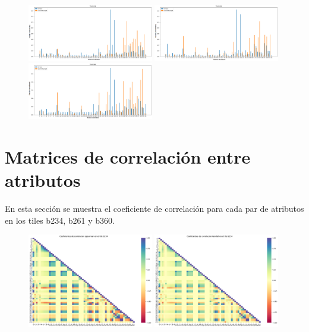 \begin{appendix}
\begin{figure}[h!]
\centering
  \includegraphics[width=0.49\textwidth]{Kap6/test=b234_ML_variable_importance_scores.png} 
  \includegraphics[width=0.49\textwidth]{Kap6/test=b261_ML_variable_importance_scores.png} \\
  \includegraphics[width=0.49\textwidth]{Kap6/test=b360_ML_variable_importance_scores.png} 
\end{figure}

\section{Matrices de correlación entre atributos}
\label{anexo_matrices_correlacion}
En esta sección se muestra el coeficiente de correlación para cada par de atributos en los tiles b234, b261 y b360.

\begin{figure}[h!]
\centering
  \includegraphics[width=0.49\textwidth]{Kap6/spearman_b234_MATRIX.png} 
  \includegraphics[width=0.49\textwidth]{Kap6/kendall_b234_MATRIX.png}
\end{figure}


\end{appendix}
